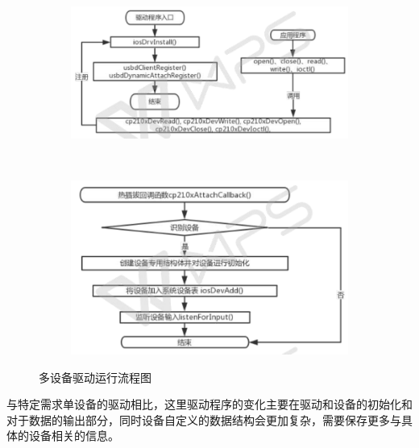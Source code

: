 \begin{figure}[p, !h]
\centering
  \begin{subfigure}[b]{1.0\textwidth}
  \includegraphics[width=\textwidth]{./graphics/MDev-Drv-Diagram-a.pdf}
  \caption{}\label{fig:MDevice-Driver-diagram-a}
  \end{subfigure}
  ~
  \begin{subfigure}[b]{1.0\textwidth}
  \includegraphics[width=\textwidth]{./graphics/MDev-Drv-Diagram-b.pdf}
  \caption{}\label{fig:MDevice-Driver-diagram-b}
  \end{subfigure}
\caption{多设备驱动运行流程图}\label{fig:MDev-Drv-diagram}
\end{figure}


	与特定需求单设备的驱动相比，这里驱动程序的变化主要在驱动和设备的初始化和对于数据的输出部分，同时设备自定义的数据结构会更加复杂，需要保存更多与具体的设备相关的信息。

